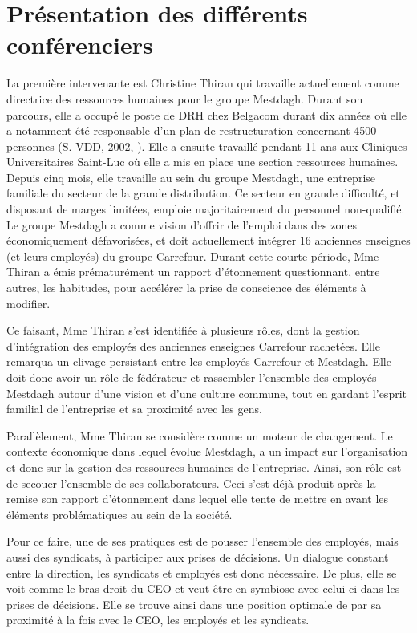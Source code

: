 \section{Présentation des différents conférenciers}
La première intervenante est Christine Thiran qui travaille actuellement comme directrice des ressources humaines pour le groupe Mestdagh. Durant son parcours, elle a occupé le poste de DRH chez Belgacom durant dix années où elle a notamment été responsable d'un plan de restructuration concernant 4500 personnes (S. VDD, 2002, \cite{planBEST}).
Elle a ensuite travaillé pendant 11 ans aux Cliniques Universitaires Saint-Luc où elle a mis en place une section ressources humaines.
Depuis cinq mois, elle travaille au sein du groupe Mestdagh, une entreprise familiale du secteur de la grande distribution. Ce secteur en grande difficulté, et disposant de marges limitées, emploie majoritairement du personnel non-qualifié. Le groupe Mestdagh a comme vision d'offrir de l'emploi dans des zones économiquement défavorisées, et doit actuellement intégrer 16 anciennes enseignes (et leurs employés) du groupe Carrefour.
Durant cette courte période, Mme Thiran a émis prématurément un rapport d'étonnement questionnant, entre autres, les habitudes, pour accélérer la prise de conscience des éléments à modifier. \newline

Ce faisant, Mme Thiran s'est identifiée à plusieurs rôles, dont la gestion d'intégration des employés des anciennes enseignes Carrefour rachetées. Elle remarqua un clivage persistant entre les employés Carrefour et Mestdagh. Elle doit donc avoir un rôle de fédérateur et rassembler l'ensemble des employés Mestdagh autour d'une vision et d'une culture commune, tout en gardant l'esprit familial de l'entreprise et sa proximité avec les gens.\newline

Parallèlement, Mme Thiran se considère comme un moteur de changement. Le contexte économique dans lequel évolue Mestdagh, a un impact sur l'organisation et donc sur la gestion des ressources humaines de l'entreprise. Ainsi, son rôle est de \og{}secouer\fg{} l'ensemble de ses collaborateurs. Ceci s'est déjà produit après la remise son rapport d'étonnement dans lequel elle tente de mettre en avant les éléments problématiques au sein de la société.\newline

Pour ce faire, une de ses pratiques est de pousser l'ensemble des employés, mais aussi des syndicats, à participer aux prises de décisions. Un dialogue constant entre la direction, les syndicats et employés est donc nécessaire. De plus, elle se voit comme le bras droit du CEO et veut être en symbiose avec celui-ci dans les prises de décisions. Elle se trouve ainsi dans une position optimale de par sa proximité à la fois avec le CEO, les employés et les syndicats.\newline

